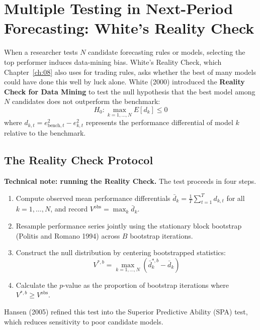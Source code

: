 \section{Multiple Testing in Next-Period Forecasting: White's Reality Check}
\label{sec:09-reality}

When a researcher tests $N$ candidate forecasting rules or models, selecting the top performer induces data-mining bias. White's Reality Check, which Chapter~\ref{ch:08} also uses for trading rules, asks whether the best of many models could have done this well by luck alone. White (2000) introduced the \textbf{Reality Check for Data Mining} to test the null hypothesis that the best model among $N$ candidates does not outperform the benchmark:
\begin{equation}
  H_0: \max_{k=1, \dots, N} E[d_k] \le 0
  \label{eq:09-white-null}
\end{equation}
where $d_{k,t} = e^2_{\text{bench},t} - e^2_{k,t}$ represents the performance differential of model $k$ relative to the benchmark.

\subsection{The Reality Check Protocol}
\begin{technote}
\textbf{Technical note: running the Reality Check.} The test proceeds in four steps.
\begin{enumerate}
  \item Compute observed mean performance differentials $\bar{d}_k = \frac{1}{T} \sum_{t=1}^T d_{k,t}$ for all $k = 1, \dots, N$, and record $V^{\text{obs}} = \max_k \bar{d}_k$.
  \item Resample performance series jointly using the stationary block bootstrap (Politis and Romano 1994) across $B$ bootstrap iterations.
  \item Construct the null distribution by centering bootstrapped statistics:
  \begin{equation}
    V^{*,b} = \max_{k=1, \dots, N} \left( \bar{d}_{k}^{*,b} - \bar{d}_k \right)
  \end{equation}
  \item Calculate the $p$-value as the proportion of bootstrap iterations where $V^{*,b} \ge V^{\text{obs}}$.
\end{enumerate}
\end{technote}
Hansen (2005) refined this test into the Superior Predictive Ability (SPA) test, which reduces sensitivity to poor candidate models.

